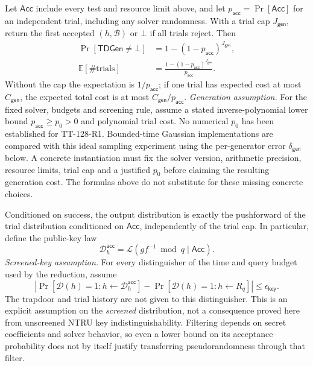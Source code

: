 \documentclass[lettersize,journal]{IEEEtran}
\begin{document}
	Let $\mathsf{Acc}$ include every test and resource limit above, and let
	$p_{\mathsf{acc}}=\Pr[\mathsf{Acc}]$ for an independent trial, including
	any solver randomness. With a trial cap $J_{\mathsf{gen}}$, return the
	first accepted $(h,\mathcal B)$ or $\bot$ if all trials reject. Then
	\[
	\begin{aligned}
		\Pr[\mathsf{TDGen}\ne\bot]
		&=1-(1-p_{\mathsf{acc}})^{J_{\mathsf{gen}}},\\
		\mathbb E[\#\text{trials}]
		&=\frac{1-(1-p_{\mathsf{acc}})^{J_{\mathsf{gen}}}}
		{p_{\mathsf{acc}}}.
	\end{aligned}
	\]
	Without the cap the expectation is $1/p_{\mathsf{acc}}$; if one trial
	has expected cost at most $C_{\mathsf{gen}}$, the expected total cost
	is at most $C_{\mathsf{gen}}/p_{\mathsf{acc}}$.
	\emph{Generation assumption.} For the fixed solver, budgets and
	screening rule, assume a stated inverse-polynomial lower bound
	$p_{\mathsf{acc}}\geq p_0>0$ and polynomial trial cost. No numerical
	$p_0$ has been established for TT-128-R1. Bounded-time Gaussian
	implementations are compared with this ideal sampling experiment using
	the per-generator error $\delta_{\mathsf{gen}}$ below.
	A concrete instantiation must fix the solver version, arithmetic
	precision, resource limits, trial cap and a justified $p_0$ before
	claiming the resulting generation cost. The formulas above do not
	substitute for these missing concrete choices.
	
	Conditioned on success, the output distribution is exactly the pushforward
	of the trial distribution conditioned on $\mathsf{Acc}$, independently
	of the trial cap. In particular, define the public-key law
	\[
	\mathcal D_h^{\mathsf{acc}}
	=\mathcal L(gf^{-1}\bmod q\mid\mathsf{Acc}).
	\]
	\emph{Screened-key assumption.} For every distinguisher of the time and
	query budget used by the reduction, assume
	\[
	\left|\Pr[\mathcal D(h)=1:h\leftarrow\mathcal D_h^{\mathsf{acc}}]
	-\Pr[\mathcal D(h)=1:h\leftarrow R_q]\right|
	\leq\epsilon_{\mathsf{key}}.
	\]
	The trapdoor and trial history are not given to this distinguisher.
	This is an explicit assumption on the \emph{screened} distribution,
	not a consequence proved here from unscreened NTRU key indistinguishability.
	Filtering depends on secret coefficients and solver behavior, so even a
	lower bound on its acceptance probability does not by itself justify
	transferring pseudorandomness through that filter.
	
\end{document}
